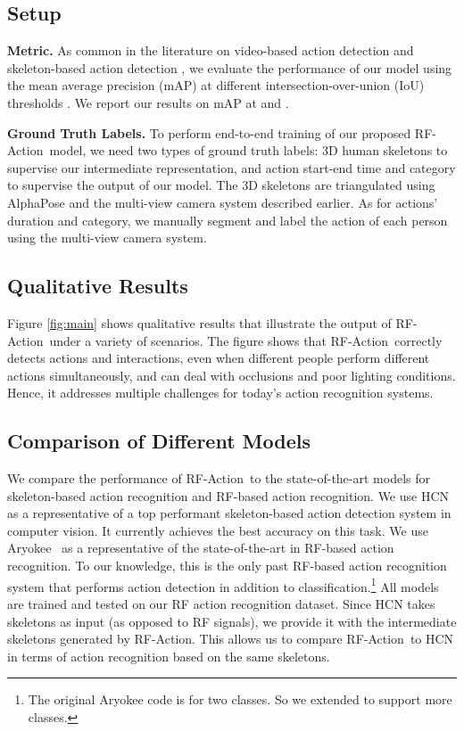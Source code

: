 \documentclass[10pt,twocolumn,letterpaper]{article}
\newcommand{\name} {RF-Action}
\begin{document}
\subsection{Setup}
\vskip 0.06in\noindent
\textbf{Metric.}
As common in the literature on video-based action detection  \cite{lin2017single,zhao2017temporal,Heilbron_2015_CVPR} and skeleton-based action detection \cite{liu2017pku,li2017skeleton,li2018co}, we evaluate the performance of our model using the mean average precision (mAP) at different intersection-over-union (IoU) thresholds . We report our results on mAP at  and . 


\vskip 0.06in\noindent
\textbf{Ground Truth Labels.}
To perform end-to-end training of our proposed \name\ model, we need two types of ground truth labels: 3D human skeletons to supervise our intermediate representation, and action start-end time and category to supervise the output of our model. The 3D skeletons are triangulated using AlphaPose and the multi-view camera system described earlier. As for actions' duration and category, we manually segment and label the action of each person using the multi-view camera system.

\subsection{Qualitative Results}
Figure \ref{fig:main} shows qualitative results that illustrate the output of \name\ under a variety of scenarios.  The figure shows that \name\ correctly detects actions and interactions, even when different people perform different actions simultaneously, and can deal with occlusions and poor lighting conditions. Hence, it addresses multiple challenges for today's action recognition systems. 


\subsection{Comparison of Different Models}

We compare the performance of \name\ to the state-of-the-art models for skeleton-based action recognition and RF-based action recognition. We use HCN as a representative of a top performant skeleton-based action detection system in computer vision. It currently achieves the best accuracy on this task.  We use Aryokee~\cite{tian2018rf} as a representative of the state-of-the-art in RF-based action recognition. To our knowledge, this is the only past RF-based action recognition system that performs action detection in addition to classification.\footnote{The original Aryokee code is for two classes. So we extended to support more classes.} All models are trained and tested on our RF action recognition dataset. Since HCN takes skeletons as input (as opposed to RF signals), we provide it with the intermediate skeletons generated by \name. This allows us to compare \name\ to HCN in terms of action recognition based on the same skeletons. 
\end{document}
